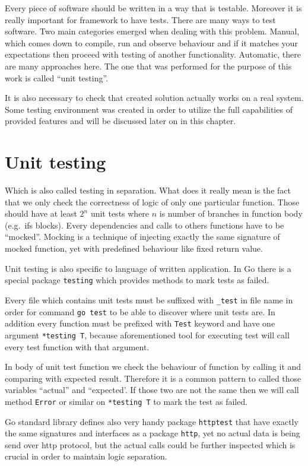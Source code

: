 Every piece of software should be written in a way that is testable. Moreover it is really important for framework to have tests. There are many ways to test software. Two main categories emerged when dealing with this problem. Manual, which comes down to compile, run and observe behaviour and if it matches your expectations then proceed with testing of another functionality. Automatic, there are many approaches here. The one that was performed for the purpose of this work is called ``unit testing''.

It is also necessary to check that created solution actually works on a real system. Some testing environment was created in order to utilize the full capabilities of provided features and will be discussed later on in this chapter.

\section{Unit testing}
Which is also called testing in separation. What does it really mean is the fact that we only check the correctness of logic of only one particular function. Those should have at least $2^n$ unit tests where $n$ is number of branches in function body (e.g.\ ifs blocks). Every dependencies and calls to others functions have to be ``mocked''. Mocking is a technique of injecting exactly the same signature of mocked function, yet with predefined behaviour like fixed return value.

Unit testing is also specific to language of written application. In Go there is a special package \verb|testing| which provides methods to mark tests as failed.

Every file which contains unit tests must be suffixed with \verb|_test| in file name\cite{Testing-go} in order for command \verb|go test| to be able to discover where unit tests are. In addition every function must be prefixed with \verb|Test| keyword and have one argument \verb|*testing T|, because aforementioned tool for executing test will call every test function with that argument.

In body of unit test function we check the behaviour of function by calling it and comparing with expected result. Therefore it is a common pattern to called those variables ``actual'' and ``expected'. If those two are not the same then we will call method \verb|Error| or similar on \verb|*testing T| to mark the test as failed.

Go standard library defines also very handy package \verb|httptest|\cite{httptest-go} that have exactly the same signatures and interfaces as a package \verb|http|, yet no actual data is being send over http protocol, but the actual calls could be further inspected which is crucial in order to maintain logic separation.

